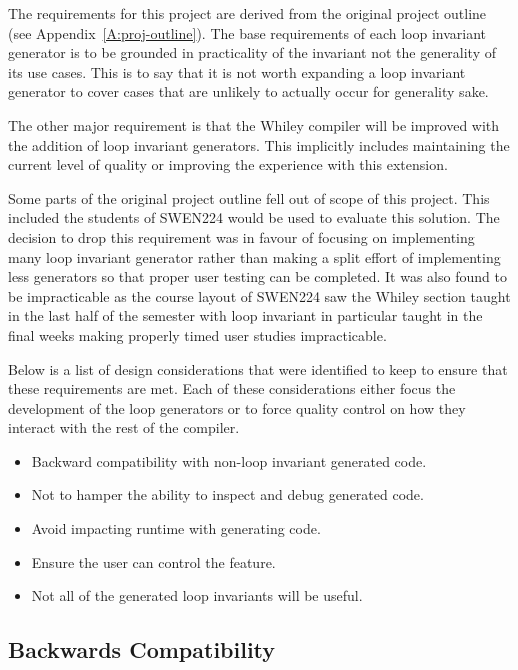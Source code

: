 The requirements for this project are derived from the original project
outline (see Appendix~\ref{A:proj-outline}).
The base requirements of each loop invariant generator is to be grounded
in practicality of the invariant not the generality of its use cases.
This is to say that it is not worth expanding a loop invariant
generator to cover cases that are unlikely to actually occur for generality
sake.

The other major requirement is that the Whiley compiler will be improved
with the addition of loop invariant generators.
This implicitly includes maintaining the current level of quality or
improving the experience with this extension.

Some parts of the original project outline fell out of scope of this project.
This included the students of SWEN224 would be used to evaluate this solution.
The decision to drop this requirement was in favour of focusing on implementing
many loop invariant generator rather than making a split effort of implementing
less generators so that proper user testing can be completed.
It was also found to be impracticable as the course layout of SWEN224 saw the
Whiley section taught in the last half of the semester with loop invariant in
particular taught in the final weeks making properly timed user studies
impracticable.



Below is a list of design considerations that were identified to keep to ensure
that these requirements are met.
Each of these considerations either focus the development of the loop
generators or to force quality control on how they interact with the rest of the
compiler.

\begin{itemize}
    \item{Backward compatibility with non-loop invariant generated code.}
    \item{Not to hamper the ability to inspect and debug generated code.}
    \item{Avoid impacting runtime with generating code.}
    \item{Ensure the user can control the feature.}
    \item{Not all of the generated loop invariants will be useful.}
\end{itemize}

\subsection{Backwards Compatibility}


